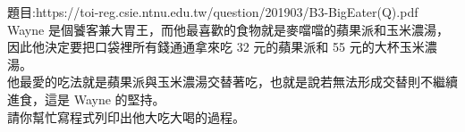 題目:https://toi-reg.csie.ntnu.edu.tw/question/201903/B3-BigEater(Q).pdf\\
Wayne 是個饕客兼大胃王，而他最喜歡的食物就是麥噹噹的蘋果派和玉米濃湯，因此他決定要把口袋裡所有錢通通拿來吃 32 元的蘋果派和 55 元的大杯玉米濃湯。\\
他最愛的吃法就是蘋果派與玉米濃湯交替著吃，也就是說若無法形成交替則不繼續進食，這是 Wayne 的堅持。\\
請你幫忙寫程式列印出他大吃大喝的過程。\\

